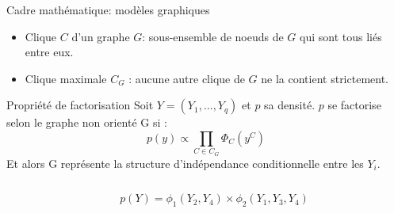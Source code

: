 \documentclass[11pt]{bredelebeamer}
\begin{document}
\begin{frame}{Cadre mathématique: modèles graphiques }
\begin{itemize}
\item Clique $C$ d'un graphe $G$: sous-ensemble de noeuds de $G$ qui sont tous liés entre eux.\\

\item Clique maximale $C_{G}$ : aucune autre clique de $G$ ne la contient strictement.\\

\end{itemize}

\begin{exampleblock}{Propriété de factorisation \cite{Lau96}}
Soit  $Y = (Y_1,...,Y_q)$ et $p$ sa densité. $p$ se factorise selon le graphe non orienté G si :
\[ p(y) \propto \prod_{C \in C_G} \Phi_C (y^C) \]
Et alors G représente la structure d'indépendance conditionnelle entre les $Y_i$.
\end{exampleblock} 
\begin{columns}
 \begin{column}{0.35\linewidth}
 \begin{flushright}
\vspace{0.3cm}
 \\
\end{flushright}
 \end{column}
 \begin{column}{0.6\linewidth}
 \begin{flushleft}
    $p(Y) = \phi_1(Y_2,Y_4) \times \phi_2(Y_1,Y_3,Y_4)$
 \end{flushleft}
 \end{column}
\end{columns}
\end{frame}
\end{document}
